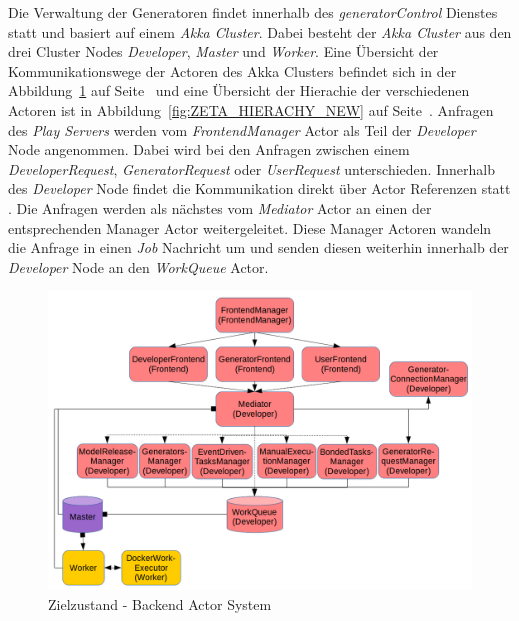 Die Verwaltung der Generatoren findet innerhalb des \textit{generatorControl} Dienstes statt und basiert auf einem \textit{Akka Cluster}. Dabei besteht der \textit{Akka Cluster} aus den drei Cluster Nodes \textit{Developer}, \textit{Master} und \textit{Worker}. Eine Übersicht der Kommunikationswege der Actoren des Akka Clusters befindet sich in der Abbildung~\ref{fig:ZETA_ACTOR_NEW} auf Seite~\pageref{fig:ZETA_ACTOR_NEW} und eine Übersicht der Hierachie der verschiedenen Actoren ist in Abbildung~\ref{fig:ZETA_HIERACHY_NEW} auf Seite~\pageref{fig:ZETA_HIERACHY_NEW}. Anfragen des \textit{Play Servers} werden vom \textit{FrontendManager} Actor als Teil der \textit{Developer} Node angenommen. Dabei wird bei den Anfragen zwischen einem \textit{DeveloperRequest}, \textit{GeneratorRequest} oder \textit{UserRequest} unterschieden. Innerhalb des \textit{Developer} Node findet die Kommunikation direkt über Actor Referenzen statt \cite{akka_actor}. Die Anfragen werden als nächstes vom \textit{Mediator} Actor an einen der entsprechenden Manager Actor weitergeleitet. Diese Manager Actoren wandeln die Anfrage in einen \textit{Job} Nachricht um und senden diesen weiterhin innerhalb der \textit{Developer} Node an den \textit{WorkQueue} Actor.

\begin{figure}
    \centering
    \includegraphics[width=5in]{figures/actor_backend_final.png}
    \caption{Zielzustand - Backend Actor System}
    \label{fig:ZETA_ACTOR_NEW}
\end{figure}


